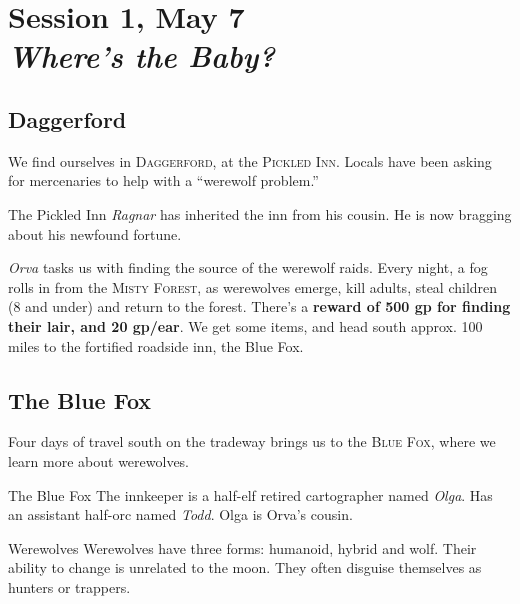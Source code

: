 \documentclass[10pt,twoside,twocolumn]{article}
\begin{document}
\selectfont %

\section{Session 1,  May 7\\\textit{Where's the Baby?}}
\subsection{Daggerford}
We find ourselves in \textsc{Daggerford}, at the \textsc{Pickled Inn}. Locals have been
asking for mercenaries to help with a ``werewolf problem.''

\begin{commentbox}{The Pickled Inn}
  \textit{Ragnar} has inherited the inn from his  cousin. He is now bragging
  about his newfound fortune.
\end{commentbox}

\textit{Orva} tasks us with finding the source of the werewolf raids. Every
night, a fog rolls in from the \textsc{Misty Forest}, as werewolves emerge,
kill adults, steal children (8 and under) and return to the
forest. There's a \textbf{reward of 500 gp for finding their lair, and 20
gp/ear}. We get some items, and head south approx. 100 miles to the
fortified roadside inn, the Blue Fox.

\subsection{The Blue Fox}
Four days of travel south on the tradeway brings us to the \textsc{Blue Fox},
where we learn more about werewolves.

\begin{commentbox}{The Blue Fox}
  The innkeeper is a half-elf retired cartographer named \textit{Olga}. Has an
  assistant half-orc named \textit{Todd}. Olga is Orva's cousin.
\end{commentbox}

\begin{paperbox}{Werewolves}
  Werewolves have three forms: humanoid, hybrid and wolf. Their
  ability to change is unrelated to the moon. They often disguise
  themselves as hunters or trappers.
\end{paperbox}
\end{document}

